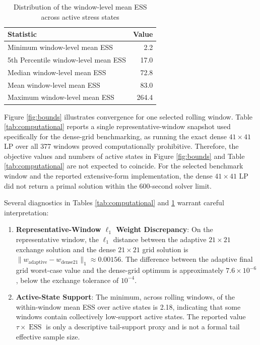 \documentclass[smallextended]{svjour3}
\begin{document}
\begin{table}[htbp]
\centering
\caption{Distribution of the window-level mean ESS across active stress states}
\label{tab:ess_diagnostics}
\begin{tabular}{lr}
\toprule
\textbf{Statistic} & \textbf{Value} \\
\midrule
Minimum window-level mean ESS & 2.2 \\
5th Percentile window-level mean ESS & 17.0 \\
Median window-level mean ESS & 72.8 \\
Mean window-level mean ESS & 83.0 \\
Maximum window-level mean ESS & 264.4 \\
\bottomrule
\end{tabular}
\end{table}

Figure \ref{fig:bounds} illustrates convergence for one selected rolling window. Table \ref{tab:computational} reports a single representative-window snapshot used specifically for the dense-grid benchmarking, as running the exact dense $41\times41$ LP over all 377 windows proved computationally prohibitive. Therefore, the objective values and numbers of active states in Figure \ref{fig:bounds} and Table \ref{tab:computational} are not expected to coincide. For the selected benchmark window and the reported extensive-form implementation, the dense $41\times41$ LP did not return a primal solution within the 600-second solver limit.

Several diagnostics in Tables \ref{tab:computational} and \ref{tab:ess_diagnostics} warrant careful interpretation:
\begin{enumerate}
    \item \textbf{Representative-Window $\ell_1$ Weight Discrepancy}: On the representative window, the $\ell_1$ distance between the adaptive $21\times21$ exchange solution and the dense $21\times21$ grid solution is $\|w_{\mathrm{adaptive}}-w_{\mathrm{dense21}}\|_1 \approx 0.00156$. The difference between the adaptive final grid worst-case value and the dense-grid optimum is approximately $7.6\times10^{-6}$, below the exchange tolerance of $10^{-4}$.
    \item \textbf{Active-State Support}: The minimum, across rolling windows, of the within-window mean ESS over active states is 2.18, indicating that some windows contain collectively low-support active states. The reported value $\tau\times \operatorname{ESS}$ is only a descriptive tail-support proxy and is not a formal tail effective sample size.\end{enumerate}
\end{document}
